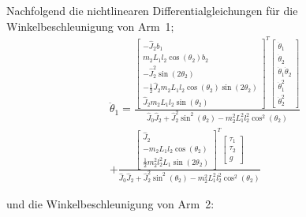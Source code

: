Nachfolgend die nichtlinearen Differentialgleichungen für die Winkelbeschleunigung von Arm~1;
\begin{multline}
\ddot{\theta}_1 =
\frac{
\begin{bmatrix}
	-\hat{J}_2b_1 \\ 
	m_2L_1l_2\cos(\theta_2)b_2 \\ 
	-\hat{J}^2_2\sin(2\theta_2) \\ 
	-\frac{1}{2}\hat{J}_2m_2L_1l_2\cos(\theta_2)\sin(2\theta_2) \\ 
	\hat{J}_2m_2L_1l_2\sin(\theta_2)
\end{bmatrix}^T
\begin{bmatrix}
	\dot{\theta}_1 \\ 
	\dot{\theta}_2 \\ 
	\dot{\theta}_1\dot{\theta}_2 \\ 
	\dot{\theta}^2_1 \\ 
	\dot{\theta}^2_2
\end{bmatrix} }
{\hat{J}_0\hat{J}_2+\hat{J}^2_2\sin^2(\theta_2)-m^2_2L^2_1l^2_2\cos^2(\theta_2)} \\ 
+
\frac{
\begin{bmatrix}
	\hat{J}_2 \\ 
	-m_2L_1l_2\cos(\theta_2) \\ 
	\frac{1}{2}m^2_2l^2_2L_1\sin(2\theta_2)
\end{bmatrix}^T
\begin{bmatrix}
	\tau_1 \\ 
	\tau_2 \\ 
	g
\end{bmatrix} }
{\hat{J}_0\hat{J}_2+\hat{J}^2_2\sin^2(\theta_2)-m^2_2L^2_1l^2_2\cos^2(\theta_2)}
\end{multline}

und die Winkelbeschleunigung von Arm~2:

